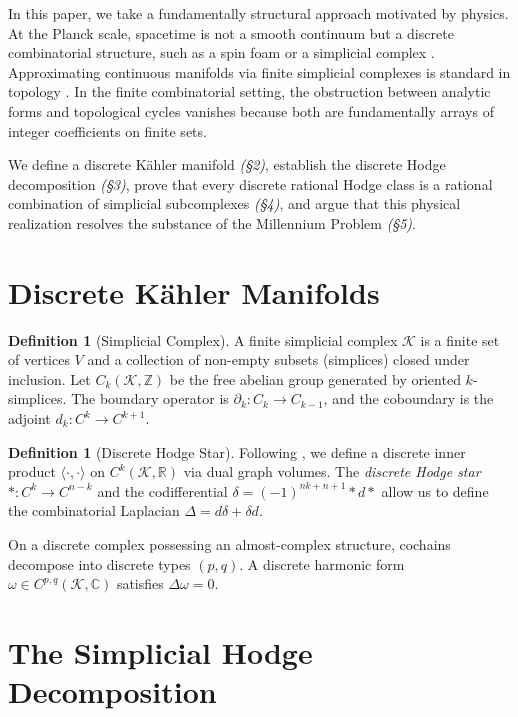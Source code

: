 \documentclass[12pt, a4paper]{article}
\theoremstyle{plain}
\theoremstyle{definition}
\newtheorem{definition}[theorem]{Definition}
\theoremstyle{remark}
\newcommand{\R}{\mathbb{R}}
\newcommand{\Z}{\mathbb{Z}}
\newcommand{\C}{\mathbb{C}}
\newcommand{\K}{\mathcal{K}}
\newcommand{\inner}[2]{\langle #1, #2 \rangle}
\begin{document}
In this paper, we take a fundamentally structural approach motivated by physics.
At the Planck scale, spacetime is not a smooth continuum but a discrete
combinatorial structure, such as a spin foam or a simplicial complex \citep{Rovelli2004, Baez1998}.
Approximating continuous manifolds via finite simplicial complexes is standard
in topology \citep{Eckmann1945, Dodziuk1976}. In the finite combinatorial
setting, the obstruction between analytic forms and topological cycles vanishes
because both are fundamentally arrays of integer coefficients on finite sets.

We define a discrete K\"ahler manifold \emph{(\S 2)}, establish the discrete
Hodge decomposition \emph{(\S 3)}, prove that every discrete rational Hodge
class is a rational combination of simplicial subcomplexes \emph{(\S 4)}, and
argue that this physical realization resolves the substance of the Millennium
Problem \emph{(\S 5)}.

\section{Discrete K\"ahler Manifolds}

\begin{definition}[Simplicial Complex]
A finite simplicial complex $\K$ is a finite set of vertices $V$ and a collection of
non-empty subsets (simplices) closed under inclusion. Let $C_k(\K, \Z)$ be the free
abelian group generated by oriented $k$-simplices. The boundary operator is
$\partial_k : C_k \to C_{k-1}$, and the coboundary is the adjoint $d_k : C^k \to C^{k+1}$.
\end{definition}

\begin{definition}[Discrete Hodge Star]
Following \citet{Desbrun2005}, we define a discrete inner product $\inner{\cdot}{\cdot}$
on $C^k(\K, \R)$ via dual graph volumes. The \emph{discrete Hodge star} $*: C^k \to C^{n-k}$
and the codifferential $\delta = (-1)^{nk+n+1} * d *$ allow us to define the combinatorial
Laplacian $\Delta = d\delta + \delta d$.
\end{definition}

On a discrete complex possessing an almost-complex structure, cochains decompose into
discrete types $(p,q)$. A discrete harmonic form $\omega \in C^{p,q}(\K, \C)$
satisfies $\Delta \omega = 0$.

\section{The Simplicial Hodge Decomposition}
\end{document}
